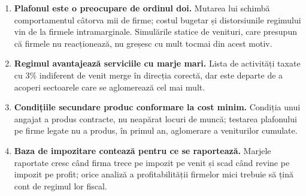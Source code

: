 \documentclass[11pt]{article}
\begin{document}
\begin{enumerate}
\item \textbf{Plafonul este o preocupare de ordinul doi.} Mutarea lui schimbă comportamentul câtorva mii de firme; costul bugetar și distorsiunile regimului vin de la firmele intramarginale. Simulările statice de venituri, care presupun că firmele nu reacționează, nu greșesc cu mult tocmai din acest motiv.
\item \textbf{Regimul avantajează serviciile cu marje mari.} Lista de activități taxate cu 3\% indiferent de venit merge în direcția corectă, dar este departe de a acoperi sectoarele care se aglomerează cel mai mult.
\item \textbf{Condițiile secundare produc conformare la cost minim.} Condiția unui angajat a produs contracte, nu neapărat locuri de muncă; testarea plafonului pe firme legate nu a produs, în primul an, aglomerare a veniturilor cumulate.
\item \textbf{Baza de impozitare contează pentru ce se raportează.} Marjele raportate cresc când firma trece pe impozit pe venit și scad când revine pe impozit pe profit; orice analiză a profitabilității firmelor mici trebuie să țină cont de regimul lor fiscal.
\end{enumerate}

\FloatBarrier
\end{document}
